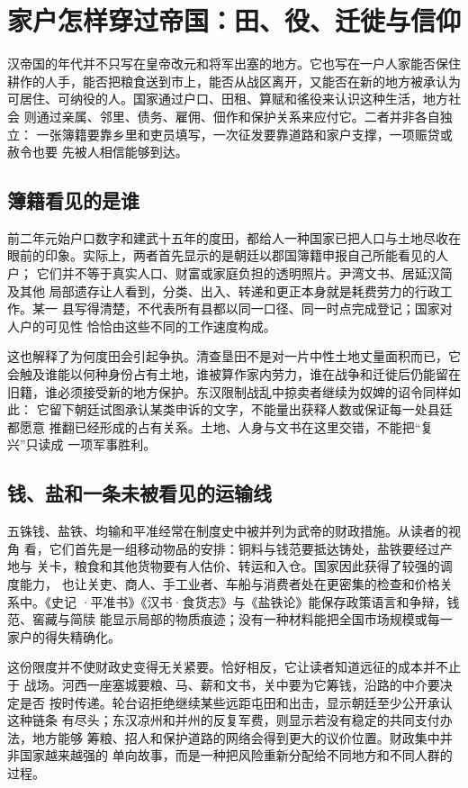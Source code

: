 \section{家户怎样穿过帝国：田、役、迁徙与信仰}
\label{sec:han-households-mobility}

汉帝国的年代并不只写在皇帝改元和将军出塞的地方。它也写在一户人家能否保住
耕作的人手，能否把粮食送到市上，能否从战区离开，又能否在新的地方被承认为
可居住、可纳役的人。国家通过户口、田租、算赋和徭役来认识这种生活，地方社会
则通过亲属、邻里、债务、雇佣、佃作和保护关系来应付它。二者并非各自独立：
一张簿籍要靠乡里和吏员填写，一次征发要靠道路和家户支撑，一项赈贷或赦令也要
先被人相信能够到达。

\subsection{簿籍看见的是谁}

前二年元始户口数字和建武十五年的度田，都给人一种国家已把人口与土地尽收在
眼前的印象。实际上，两者首先显示的是朝廷以郡国簿籍申报自己所能看见的人户；
它们并不等于真实人口、财富或家庭负担的透明照片。尹湾文书、居延汉简及其他
局部遗存让人看到，分类、出入、转递和更正本身就是耗费劳力的行政工作。某一
县写得清楚，不代表所有县都以同一口径、同一时点完成登记；国家对人户的可见性
恰恰由这些不同的工作速度构成。

这也解释了为何度田会引起争执。清查垦田不是对一片中性土地丈量面积而已，它
会触及谁能以何种身份占有土地，谁被算作家内劳力，谁在战争和迁徙后仍能留在
旧籍，谁必须接受新的地方保护。东汉限制战乱中掠卖者继续为奴婢的诏令同样如此：
它留下朝廷试图承认某类申诉的文字，不能量出获释人数或保证每一处县廷都愿意
推翻已经形成的占有关系。土地、人身与文书在这里交错，不能把“复兴”只读成
一项军事胜利。

\subsection{钱、盐和一条未被看见的运输线}

五铢钱、盐铁、均输和平准经常在制度史中被并列为武帝的财政措施。从读者的视角
看，它们首先是一组移动物品的安排：铜料与钱范要抵达铸处，盐铁要经过产地与
关卡，粮食和其他货物要有人估价、转运和入仓。国家因此获得了较强的调度能力，
也让关吏、商人、手工业者、车船与消费者处在更密集的检查和价格关系中。《史记
·平准书》《汉书·食货志》与《盐铁论》能保存政策语言和争辩，钱范、窖藏与简牍
能显示局部的物质痕迹；没有一种材料能把全国市场规模或每一家户的得失精确化。

这份限度并不使财政史变得无关紧要。恰好相反，它让读者知道远征的成本并不止于
战场。河西一座塞城要粮、马、薪和文书，关中要为它筹钱，沿路的中介要决定是否
按时传递。轮台诏拒绝继续某些远距屯田和出击，显示朝廷至少公开承认这种链条
有尽头；东汉凉州和并州的反复军费，则显示若没有稳定的共同支付办法，地方能够
筹粮、招人和保护道路的网络会得到更大的议价位置。财政集中并非国家越来越强的
单向故事，而是一种把风险重新分配给不同地方和不同人群的过程。

